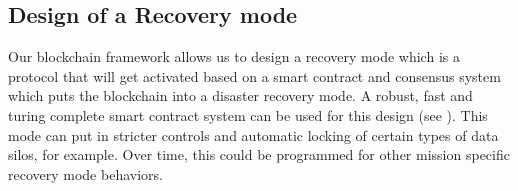 \subsection{Design of a Recovery mode}

Our blockchain framework allows us to design a recovery mode which is a protocol that will get activated based on a 
smart contract and consensus system which puts the blockchain into a disaster recovery mode. A robust, fast and turing
complete smart contract system can be used for this design (see \cite{kalodner2018}). This mode can put in 
stricter controls and automatic locking of certain types of data silos, for example. Over time, this could be programmed
for other mission specific recovery mode behaviors.

